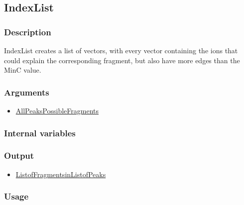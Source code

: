 \subsection{IndexList}\label{IndexList}
\subsubsection{Description}
IndexList creates a list of vectors, with every vector containing the ions that could explain the corresponding fragment, but also have more edges than the MinC value.
\subsubsection{Arguments}
\begin{itemize}
\item \hyperref[AllPeaksPossibleFragments]{AllPeaksPossibleFragments}
\end{itemize}
\subsubsection{Internal variables}
\subsubsection{Output}
\begin{itemize}
\item \hyperref[ListofFragmentsinListofPeaks]{ListofFragmentsinListofPeaks}
\end{itemize}
\subsubsection{Usage}


